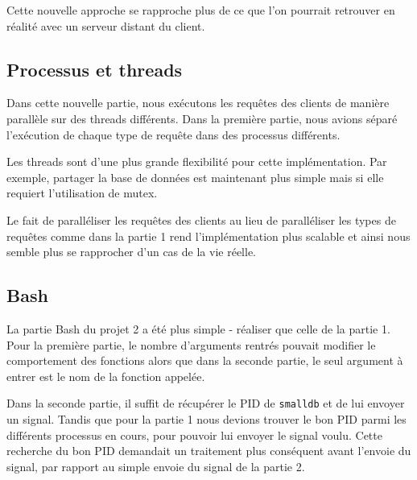 \documentclass[utf8]{article}
\begin{document}
Cette nouvelle approche se rapproche plus de ce que l'on pourrait retrouver en réalité avec un serveur distant du client.


\subsection{Processus et threads}

Dans cette nouvelle partie, nous exécutons les requêtes des clients de manière parallèle sur des threads différents. Dans la première partie, nous avions séparé l'exécution de chaque type de requête dans des processus différents.

Les threads sont d'une plus grande flexibilité pour cette implémentation. Par exemple, partager la base de données est maintenant plus simple mais si elle requiert l'utilisation de mutex.

Le fait de paralléliser les requêtes des clients au lieu de paralléliser les types de requêtes comme dans la partie 1 rend l'implémentation plus scalable et ainsi nous semble plus se rapprocher d'un cas de la vie réelle.


\subsection{Bash}

La partie Bash du projet 2  a été plus simple - réaliser que celle de la partie 1.
Pour la première partie, le nombre d'arguments rentrés pouvait modifier le comportement des fonctions alors que dans la seconde partie, le seul argument à entrer est le nom de la fonction appelée.

Dans la seconde partie, il suffit de récupérer le PID de \texttt{smalldb} et de lui envoyer un signal. Tandis que pour la partie 1 nous devions trouver le bon PID parmi les différents processus en cours, pour pouvoir lui envoyer le signal voulu. Cette recherche du bon PID demandait un traitement plus conséquent avant l'envoie du signal, par rapport au simple envoie du signal de la partie 2. 
\end{document}
